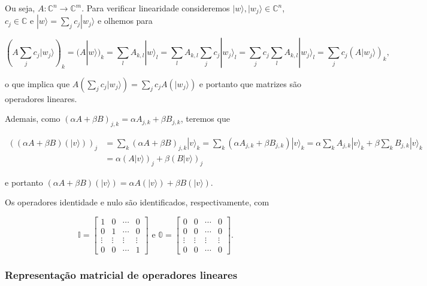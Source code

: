 \documentclass[11pt]{article}
\begin{document}
Ou seja, \(A:\mathbb{C}^{n}\rightarrow\mathbb{C}^{m}\). Para verificar
linearidade consideremos \(|w\rangle,|w_{j}\rangle\in\mathbb{C}^{n}\),
\(c_{j}\in\mathbb{C}\) e \(|w\rangle=\sum_{j}c_{j}|w_{j}\rangle\) e
olhemos para

\begin{equation}
\left(A\sum_{j}c_{j}|w_{j}\rangle\right)_{k} = (A|w\rangle)_{k} = \sum_{l}A_{k,l}|w\rangle_{l} = \sum_{l}A_{k,l}\sum_{j}c_{j}|w_{j}\rangle_{l} = \sum_{j}c_{j}\sum_{l}A_{k,l}|w_{j}\rangle_{l} = \sum_{j}c_{j}(A|w_{j}\rangle)_{k},
\end{equation}

o que implica que
\(A\left(\sum_{j}c_{j}|w_{j}\rangle\right)=\sum_{j}c_{j}A(|w_{j}\rangle)\)
e portanto que matrizes são operadores lineares.

Ademais, como \((\alpha A+\beta B)_{j,k}=\alpha A_{j,k}+\beta B_{j,k}\),
teremos que

\begin{align}
((\alpha A+\beta B)(|v\rangle))_{j} &= \sum_{k}(\alpha A+\beta B)_{j,k}|v\rangle_{k} = \sum_{k}(\alpha A_{j,k}+\beta B_{j,k})|v\rangle_{k} = \alpha\sum_{k}A_{j,k}|v\rangle_{k} + \beta\sum_{k}B_{j,k}|v\rangle_{k} \\ 
& = \alpha(A|v\rangle)_{j}+ \beta(B|v\rangle)_{j}
\end{align}

e portanto
\((\alpha A+\beta B)(|v\rangle)= \alpha A(|v\rangle) + \beta B(|v\rangle)\).

Os operadores identidade e nulo são identificados, respectivamente, com

\begin{equation}
\mathbb{I}=\begin{bmatrix} 1 & 0 & \cdots & 0 \\ 0 & 1 & \cdots & 0 \\ \vdots & \vdots & \vdots & \vdots \\ 0 & 0 & \cdots & 1 \end{bmatrix} \text{ e } \mathbb{0}=\begin{bmatrix} 0 & 0 & \cdots & 0 \\ 0 & 0 & \cdots & 0 \\ \vdots & \vdots & \vdots & \vdots \\ 0 & 0 & \cdots & 0 \end{bmatrix}.
\end{equation}

    \subsubsection{Representação matricial de operadores
lineares}\label{representauxe7uxe3o-matricial-de-operadores-lineares}
\end{document}
